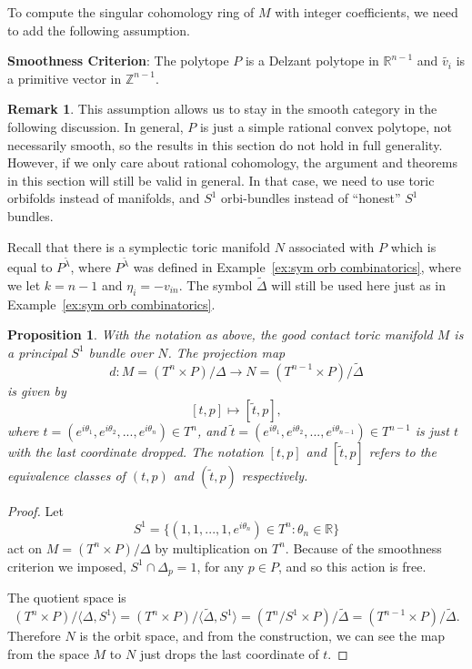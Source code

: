 \documentclass[12pt]{amsart}
\def\Z {{\mathbb{Z}}}
\def\R {{\mathbb{R}}}
\newtheorem{proposition}[theorem]{Proposition}
\theoremstyle{definition}
\newtheorem{remark}[theorem]{Remark}
\numberwithin{equation}{section}
\begin{document}
To compute the singular cohomology ring of $M$ with integer
coefficients, we need to add the following assumption.

 {\bf Smoothness Criterion}: The polytope $P$ is a Delzant polytope in
 $\R^{n-1}$ and $\tilde{v_{i}}$ is a primitive vector in $\Z^{n-1}$.

 \begin{remark}
This assumption allows us to stay in the smooth category in the
following discussion. In general, $P$ is just a simple rational
convex polytope, not necessarily smooth, so the
 results in this section do not hold in full generality. However, if
 we only care about rational cohomology, the argument and theorems in
 this section will still be valid in general. In that case, we need
 to use toric orbifolds instead of manifolds, and $S^1$ orbi-bundles instead of ``honest'' $S^1$ bundles.
 \end{remark}

Recall that there is a symplectic toric manifold $N$ associated with
$P$ which is equal to $P^{\tilde{\lambda}}$, where
$P^{\tilde{\lambda}}$ was defined in Example~\ref{ex:sym orb
combinatorics}, where we let $k=n-1$ and $\eta_{i}=-v_{in}$. The
symbol $\tilde{\Delta}$ will still be used here just as in
Example~\ref{ex:sym orb combinatorics}.

\begin{proposition}\label{S1 bundle}
With the notation as above, the good contact toric manifold $M$ is a
principal $S^{1}$ bundle over $N$. The projection map
\[d: M=(T^n\times P)/\Delta \rightarrow  N=(T^{n-1}\times P)/\widetilde{\Delta}\]
is given by
\[[t,p]\mapsto [\tilde{t},p],\]
where $t=(e^{i\theta_{1}},e^{i\theta_{2}},...,e^{i\theta_{n}})\in
T^n$, and
$\tilde{t}=(e^{i\theta_{1}},e^{i\theta_{2}},...,e^{i\theta_{n-1}})\in
T^{n-1}$ is just $t$ with the last coordinate dropped. The notation
$[t,p]$ and $[\tilde{t},p]$ refers to the equivalence classes of
$(t,p)$ and $(\tilde{t},p)$ respectively.
\end{proposition}
\begin{proof}
Let
\begin{equation}
S^1=\{(1,1,...,1,e^{i\theta_{n}})\in T^n: \theta_{n}\in \R\}
\end{equation}
act on $M=(T^n\times P)/\Delta$ by multiplication on $T^n$. Because
of the smoothness criterion we imposed, $S^1\cap \Delta_{p}=1$, for
any $p\in P$, and so this action is free.

The quotient space is
\begin{equation}
(T^n\times P)/\langle \Delta, S^1\rangle = (T^n\times P)/\langle
\widetilde{\Delta}, S^1 \rangle = (T^n/S^1\times
P)/\widetilde{\Delta} = (T^{n-1}\times P)/\widetilde{\Delta}.
\end{equation}
Therefore $N$ is the orbit space, and from the construction, we can
see the map from the space $M$ to $N$ just drops the last coordinate
of $t$.
\end{proof}
\end{document}
